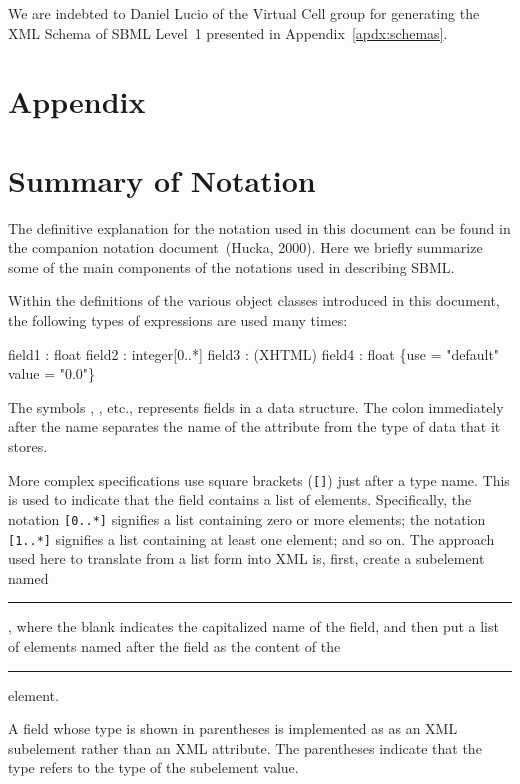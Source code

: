 \documentclass[10pt]{cekarticle}
\begin{document}
We are indebted to Daniel Lucio of the Virtual Cell group for generating
the XML Schema of SBML Level~1 presented in Appendix~\ref{apdx:schemas}.


\newpage
\section{Appendix}
\setcounter{secnumdepth}{2}
\appendix
\section{Summary of Notation}
\label{apdx:notation}

The definitive explanation for the notation used in this document can be
found in the companion notation document~(Hucka, 2000).  Here we briefly
summarize some of the main components of the notations used in describing
SBML.

Within the definitions of the various object classes introduced in this
document, the following types of expressions are used many times:

\begin{example}
  field1 : float
  field2 : integer[0..*]
  field3 : (XHTML)
  field4 : float \{use = "default" value = "0.0"\}
\end{example}

The symbols , , etc., represents fields in a
data structure.  The colon immediately after the name separates the name of
the attribute from the type of data that it stores.

More complex specifications use square brackets (\texttt{[]}) just after a
type name.  This is used to indicate that the field contains a list of
elements.  Specifically, the notation \texttt{[0..*]} signifies a list
containing zero or more elements; the notation \texttt{[1..*]} signifies a
list containing at least one element; and so on.  The approach used here to
translate from a list form into XML is, first, create a subelement named
\rule{0.5in}{0.5pt}, where the blank indicates the
capitalized name of the field, and then put a list of elements named after
the field as the content of the \rule{0.5in}{0.5pt}
element.

A field whose type is shown in parentheses is implemented as as an XML
subelement rather than an XML attribute.  The parentheses indicate that the
type refers to the type of the subelement value.
\end{document}
